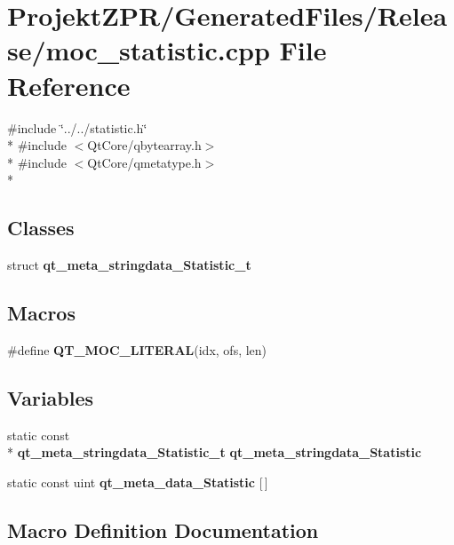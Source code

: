 \section{Projekt\-Z\-P\-R/\-Generated\-Files/\-Release/moc\-\_\-statistic.cpp File Reference}
\label{_release_2moc__statistic_8cpp}
{\ttfamily \#include \char`\"{}../../statistic.\-h\char`\"{}}\\*
{\ttfamily \#include $<$Qt\-Core/qbytearray.\-h$>$}\\*
{\ttfamily \#include $<$Qt\-Core/qmetatype.\-h$>$}\\*
\subsection*{Classes}
\begin{DoxyCompactItemize}
\item 
struct {\bf qt\-\_\-meta\-\_\-stringdata\-\_\-\-Statistic\-\_\-t}
\end{DoxyCompactItemize}
\subsection*{Macros}
\begin{DoxyCompactItemize}
\item 
\#define {\bf Q\-T\-\_\-\-M\-O\-C\-\_\-\-L\-I\-T\-E\-R\-A\-L}(idx, ofs, len)
\end{DoxyCompactItemize}
\subsection*{Variables}
\begin{DoxyCompactItemize}
\item 
static const \\*
{\bf qt\-\_\-meta\-\_\-stringdata\-\_\-\-Statistic\-\_\-t} {\bf qt\-\_\-meta\-\_\-stringdata\-\_\-\-Statistic}
\item 
static const uint {\bf qt\-\_\-meta\-\_\-data\-\_\-\-Statistic} [$\,$]
\end{DoxyCompactItemize}


\subsection{Macro Definition Documentation}
